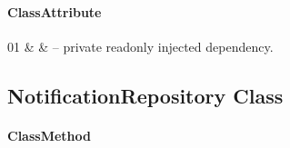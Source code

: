 \paragraph{ClassAttribute}
\begin{ClassAttributeTable}
01 &  &  -- private readonly injected dependency. \\ \hline
\end{ClassAttributeTable}

\subsection{NotificationRepository Class}
\label{cls:nhuy-NotificationRepository}

\paragraph{ClassMethod}
